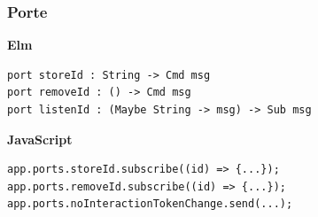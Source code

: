 \documentclass{beamer}
\begin{document}
\begin{frame}[containsverbatim]
  \frametitle{Porte}
  \textbf{Elm}
  \begin{verbatim}
port storeId : String -> Cmd msg
port removeId : () -> Cmd msg
port listenId : (Maybe String -> msg) -> Sub msg
\end{verbatim}
  \vspace{10pt}
  \textbf{JavaScript}
  \begin{verbatim}
app.ports.storeId.subscribe((id) => {...});
app.ports.removeId.subscribe((id) => {...});
app.ports.noInteractionTokenChange.send(...);
  \end{verbatim}
\end{frame}
\end{document}
